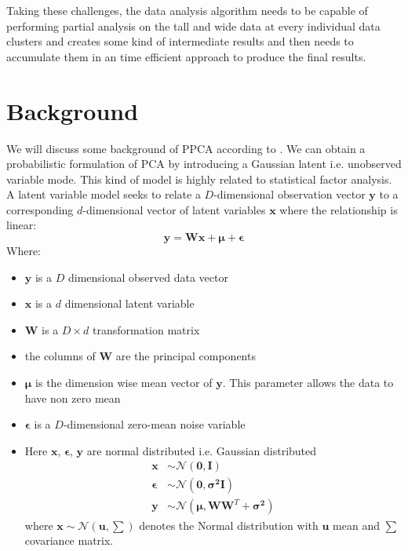 \documentclass[10pt,conference,letterpaper]{IEEEtran}
\begin{document}
Taking these challenges, the data analysis algorithm needs to be capable of performing partial analysis on the tall and wide data at every individual data clusters and creates some kind of intermediate results and then needs to accumulate them in an time efficient approach to produce the final results.




\section{Background}
We will discuss some background of PPCA according to \cite{bishop}. We can obtain a probabilistic formulation of PCA by introducing a Gaussian latent i.e. unobserved variable mode. This kind of model is highly related to statistical factor analysis. A latent variable model seeks to relate a $D$-dimensional observation vector $\pmb{y}$ to a corresponding $d$-dimensional vector of latent variables $\pmb{x}$ where the relationship is linear:
\begin{equation}
\pmb{y} = \pmb{Wx}+ \pmb{\mu} + \pmb{\epsilon}
\label{PPCA:eq1}
\end{equation}
Where:
\begin{itemize}
\item $\pmb{y}$ is a $D$ dimensional observed data vector
\item $\pmb{x}$ is a $d$ dimensional latent variable
\item $\pmb{W}$ is a $D \times d$ transformation matrix
\item the columns of $\pmb{W}$ are the principal components
\item $\pmb{\mu}$ is the dimension wise mean vector of $\pmb{y}$. This parameter allows the data to have non zero mean
\item $\pmb{\epsilon}$ is a $D$-dimensional zero-mean  noise variable
\item Here $\pmb{x}$, $\pmb{\epsilon}$, $\pmb{y}$ are normal distributed i.e. Gaussian distributed
\begin{align*}
\pmb{x} &\sim \mathcal{N}(\pmb{0},\pmb{I})\\
\pmb{\epsilon} &\sim \mathcal{N}(\pmb{0},\pmb{\sigma^2I})\\
\pmb{y} &\sim \mathcal{N}(\pmb{\mu},\pmb{WW}^T+\pmb{\sigma^2})
\end{align*}
where $\pmb{x} \sim \mathcal{N}(\pmb{u},\sum)$ denotes the Normal distribution with $\pmb{u}$ mean and $\sum$ covariance matrix.
\end{itemize}
\end{document}
